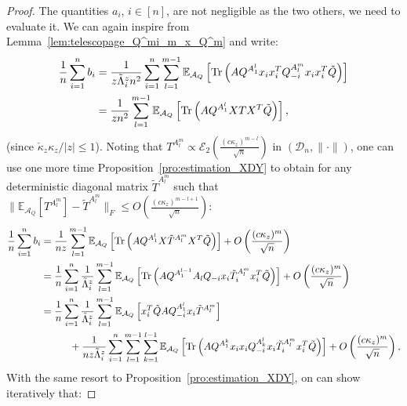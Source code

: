\documentclass[a4papaer, titlepage]{book}
\begin{document}
\begin{proof}
  The quantities $a_i$, $i \in [n]$, are not negligible as the two others, we need to evaluate it. We can again inspire from Lemma~\ref{lem:telescopage_Q^mi_m_x_Q^m} and write:
  \begin{align*}
    \frac{1}{n} \sum_{i=1}^nb_i 
     &= \frac{1}{z\tilde \Lambda_i^zn^2}\sum_{i=1}^n\sum_{l=1}^{m-1}\mathbb{E}_{\mathcal A_Q}\left[ \operatorname{Tr} \left(  A Q^{A_1^{l}}x_ix_i^TQ_{-i}^{A^{m}_{l}}x_ix_i^T\tilde Q \right)\right] \\
     &=\frac{1}{zn^2} \sum_{l=1}^{m-1}\mathbb{E}_{\mathcal A_Q}\left[ \operatorname{Tr} \left(  A Q^{A_1^{l}}XTX^T\tilde Q \right)\right],
  \end{align*}
  (since $\check\kappa_z \kappa_z/|z| \leq 1$). 
  Noting that $T^{A^{m}_{l}} \propto \mathcal E_2 \left( \frac{(c\kappa_z)^{m-l}}{\sqrt n} \right)$ in $\left( \mathcal D_n, \|\cdot \| \right)$, one can use one more time Proposition~\ref{pro:estimation_XDY} to obtain for any deterministic diagonal matrix $\tilde T^{A^{m}_{l}}$ such that $\|\mathbb E_{\mathcal A_Q}[T^{A^{m}_{l}}] - \tilde T^{A^{m}_{l}}\|_F \leq O\left( \frac{(c\kappa_z)^{m-l+1}}{\sqrt n} \right)$:
  \begin{align*}
  \frac{1}{n} \sum_{i=1}^nb_i
    &=\frac{1}{nz} \sum_{l=1}^{m-1}\mathbb{E}_{\mathcal A_Q}\left[ \operatorname{Tr} \left(  A Q^{A_1^{l}}X\tilde T^{A^{m}_{l}}X^T\tilde Q \right)\right] + O\left( \frac{(c\kappa_z)^{m}}{\sqrt n} \right)\\
    &=\frac{1}{n} \sum_{i=1}^n \frac{1}{\tilde \Lambda_i^z}\sum_{l=1}^{m-1}\mathbb{E}_{\mathcal A_Q}\left[ \operatorname{Tr} \left(  A Q^{A_1^{l-1}}A_lQ_{-i} x_i\tilde T_i^{A^{m}_{l}}x_i^T\tilde Q \right)\right] + O\left( \frac{(c\kappa_z)^{m}}{\sqrt n} \right)\\
    &= \frac{1}{n}\sum_{i=1}^n\frac{1}{\tilde \Lambda_i^z} \sum_{l=1}^{m-1}\mathbb{E}_{\mathcal A_Q}\left[ x_i^T\tilde QA Q_{-i}^{A_1^{l}}x_i\tilde T^{A^{m}_{l}}\right] \\
    &\hspace{1cm}+\frac{1}{nz\tilde\Lambda_i^z} \sum_{i=1}^n\sum_{l=1}^{m-1}\sum_{k=1}^{l-1}\mathbb{E}_{\mathcal A_Q}\left[ \operatorname{Tr} \left(  A Q^{A_1^{k}}x_ix_iQ_{-i}^{A_k^{l}}x_i\tilde T_i^{A^{m}_{l}}x_i^T\tilde Q \right)\right] + O\left( \frac{(c\kappa_z)^{m}}{\sqrt n} \right),
  \end{align*}
  With the same resort to Proposition~\ref{pro:estimation_XDY}, on can show iteratively that:

\end{proof}
\end{document}
